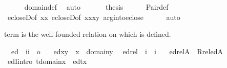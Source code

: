 \begin{isabellebody}
\ \ \ \ \isamarkupfalse%
\ domain{\isacharunderscore}{\kern0pt}def\ \isamarkupfalse%
\ auto\isanewline
\ \ \isamarkupfalse%
\isanewline
\ \ \isamarkupfalse%
\ {\isacharquery}{\kern0pt}thesis\isanewline
\ \ \ \ \isamarkupfalse%
\ Pair{\isacharunderscore}{\kern0pt}def\isanewline
\ \ \ \ \isamarkupfalse%
\ ecloseD{\isacharbrackleft}{\kern0pt}of\ {\isachardoublequoteopen}{\isacharbraceleft}{\kern0pt}x{\isacharcomma}{\kern0pt}x{\isacharbraceright}{\kern0pt}{\isachardoublequoteclose}{\isacharbrackright}{\kern0pt}\ ecloseD{\isacharbrackleft}{\kern0pt}of\ {\isachardoublequoteopen}{\isacharbraceleft}{\kern0pt}{\isacharbraceleft}{\kern0pt}x{\isacharcomma}{\kern0pt}x{\isacharbraceright}{\kern0pt}{\isacharcomma}{\kern0pt}{\isacharbraceleft}{\kern0pt}x{\isacharcomma}{\kern0pt}y{\isacharbraceright}{\kern0pt}{\isacharbraceright}{\kern0pt}{\isachardoublequoteclose}{\isacharbrackright}{\kern0pt}\ arg{\isacharunderscore}{\kern0pt}into{\isacharunderscore}{\kern0pt}eclose\isanewline
\ \ \ \ \isamarkupfalse%
\ auto\isanewline
{}\isamarkupfalse%
%
\endisatagproof
{\isafoldproof}%
%
\isadelimproof
%
\endisadelimproof
%
\begin{isamarkuptext}%
term is the well-founded relation on which  is defined.%
\end{isamarkuptext}\isamarkuptrue%
\isamarkupfalse%
\isanewline
\ \ ed\ {\isacharcolon}{\kern0pt}{\isacharcolon}{\kern0pt}\ {\isachardoublequoteopen}{\isacharbrackleft}{\kern0pt}i{\isacharcomma}{\kern0pt}i{\isacharbrackright}{\kern0pt}\ {\isasymRightarrow}\ o{\isachardoublequoteclose}\ \isanewline
\ \ {\isachardoublequoteopen}ed{\isacharparenleft}{\kern0pt}x{\isacharcomma}{\kern0pt}y{\isacharparenright}{\kern0pt}\ {\isasymequiv}\ x\ {\isasymin}\ domain{\isacharparenleft}{\kern0pt}y{\isacharparenright}{\kern0pt}{\isachardoublequoteclose}\isanewline
\isanewline
{}\isamarkupfalse%
\isanewline
\ \ edrel\ {\isacharcolon}{\kern0pt}{\isacharcolon}{\kern0pt}\ {\isachardoublequoteopen}i\ {\isasymRightarrow}\ i{\isachardoublequoteclose}\ \isanewline
\ \ {\isachardoublequoteopen}edrel{\isacharparenleft}{\kern0pt}A{\isacharparenright}{\kern0pt}\ {\isasymequiv}\ Rrel{\isacharparenleft}{\kern0pt}ed{\isacharcomma}{\kern0pt}A{\isacharparenright}{\kern0pt}{\isachardoublequoteclose}\isanewline
\isanewline
\isanewline
{}\isamarkupfalse%
\ edI{\isacharbrackleft}{\kern0pt}intro{\isacharbang}{\kern0pt}{\isacharbrackright}{\kern0pt}{\isacharcolon}{\kern0pt}\ {\isachardoublequoteopen}t{\isasymin}domain{\isacharparenleft}{\kern0pt}x{\isacharparenright}{\kern0pt}\ {\isasymLongrightarrow}\ ed{\isacharparenleft}{\kern0pt}t{\isacharcomma}{\kern0pt}x{\isacharparenright}{\kern0pt}{\isachardoublequoteclose}\isanewline

\end{isabellebody}
